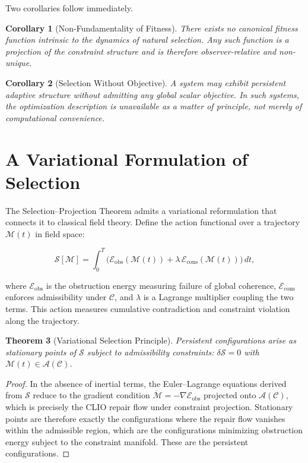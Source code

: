 \documentclass[12pt, a4paper, oneside]{article}
\theoremstyle{plain}
\newtheorem{theorem}{Theorem}[section]
\newtheorem{corollary}[theorem]{Corollary}
\theoremstyle{definition}
\theoremstyle{remark}
\newcommand{\C}{\mathcal{C}}
\newcommand{\A}{\mathcal{A}}
\begin{document}
Two corollaries follow immediately.

\begin{corollary}[Non-Fundamentality of Fitness]
There exists no canonical fitness function intrinsic to the dynamics of natural selection. Any such function is a projection of the constraint structure and is therefore observer-relative and non-unique.
\end{corollary}

\begin{corollary}[Selection Without Objective]
A system may exhibit persistent adaptive structure without admitting any global scalar objective. In such systems, the optimization description is unavailable as a matter of principle, not merely of computational convenience.
\end{corollary}

\section{A Variational Formulation of Selection}

The Selection--Projection Theorem admits a variational reformulation that connects it to classical field theory. Define the action functional over a trajectory $\mathcal{M}(t)$ in field space:

\begin{equation}
\mathcal{S}[\mathcal{M}] = \int_0^T \Big( \mathcal{E}_{\mathrm{obs}}(\mathcal{M}(t)) + \lambda\, \mathcal{E}_{\mathrm{cons}}(\mathcal{M}(t)) \Big)\, dt,
\end{equation}

where $\mathcal{E}_{\mathrm{obs}}$ is the obstruction energy measuring failure of global coherence, $\mathcal{E}_{\mathrm{cons}}$ enforces admissibility under $\C$, and $\lambda$ is a Lagrange multiplier coupling the two terms. This action measures cumulative contradiction and constraint violation along the trajectory.

\begin{theorem}[Variational Selection Principle]
\label{thm:variational}
Persistent configurations arise as stationary points of $\mathcal{S}$ subject to admissibility constraints: $\delta \mathcal{S} = 0$ with $\mathcal{M}(t) \in \A(\C)$.
\end{theorem}

\begin{proof}
In the absence of inertial terms, the Euler--Lagrange equations derived from $\mathcal{S}$ reduce to the gradient condition $\dot{\mathcal{M}} = -\nabla \mathcal{E}_{\mathrm{obs}}$ projected onto $\A(\C)$, which is precisely the CLIO repair flow under constraint projection. Stationary points are therefore exactly the configurations where the repair flow vanishes within the admissible region, which are the configurations minimizing obstruction energy subject to the constraint manifold. These are the persistent configurations.
\end{proof}
\end{document}
